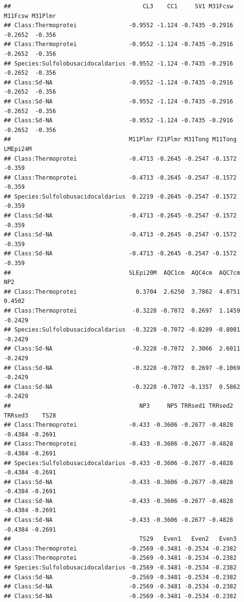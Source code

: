 \documentclass[
]{book}
\begin{document}
\begin{verbatim}
##                                      CL3    CC1     SV1 M31Fcsw M11Fcsw M31Plmr
## Class:Thermoprotei               -0.9552 -1.124 -0.7435 -0.2916 -0.2652  -0.356
## Class:Thermoprotei               -0.9552 -1.124 -0.7435 -0.2916 -0.2652  -0.356
## Species:Sulfolobusacidocaldarius -0.9552 -1.124 -0.7435 -0.2916 -0.2652  -0.356
## Class:Sd-NA                      -0.9552 -1.124 -0.7435 -0.2916 -0.2652  -0.356
## Class:Sd-NA                      -0.9552 -1.124 -0.7435 -0.2916 -0.2652  -0.356
## Class:Sd-NA                      -0.9552 -1.124 -0.7435 -0.2916 -0.2652  -0.356
##                                  M11Plmr F21Plmr M31Tong M11Tong LMEpi24M
## Class:Thermoprotei               -0.4713 -0.2645 -0.2547 -0.1572   -0.359
## Class:Thermoprotei               -0.4713 -0.2645 -0.2547 -0.1572   -0.359
## Species:Sulfolobusacidocaldarius  0.2219 -0.2645 -0.2547 -0.1572   -0.359
## Class:Sd-NA                      -0.4713 -0.2645 -0.2547 -0.1572   -0.359
## Class:Sd-NA                      -0.4713 -0.2645 -0.2547 -0.1572   -0.359
## Class:Sd-NA                      -0.4713 -0.2645 -0.2547 -0.1572   -0.359
##                                  SLEpi20M  AQC1cm  AQC4cm  AQC7cm     NP2
## Class:Thermoprotei                 0.3704  2.6250  3.7862  4.0751  0.4502
## Class:Thermoprotei                -0.3228 -0.7072  0.2697  1.1459 -0.2429
## Species:Sulfolobusacidocaldarius  -0.3228 -0.7072 -0.8289 -0.8001 -0.2429
## Class:Sd-NA                       -0.3228 -0.7072  2.3066  2.6011 -0.2429
## Class:Sd-NA                       -0.3228 -0.7072  0.2697 -0.1069 -0.2429
## Class:Sd-NA                       -0.3228 -0.7072 -0.1357  0.5862 -0.2429
##                                     NP3     NP5 TRRsed1 TRRsed2 TRRsed3    TS28
## Class:Thermoprotei               -0.433 -0.3606 -0.2677 -0.4828 -0.4384 -0.2691
## Class:Thermoprotei               -0.433 -0.3606 -0.2677 -0.4828 -0.4384 -0.2691
## Species:Sulfolobusacidocaldarius -0.433 -0.3606 -0.2677 -0.4828 -0.4384 -0.2691
## Class:Sd-NA                      -0.433 -0.3606 -0.2677 -0.4828 -0.4384 -0.2691
## Class:Sd-NA                      -0.433 -0.3606 -0.2677 -0.4828 -0.4384 -0.2691
## Class:Sd-NA                      -0.433 -0.3606 -0.2677 -0.4828 -0.4384 -0.2691
##                                     TS29   Even1   Even2   Even3
## Class:Thermoprotei               -0.2569 -0.3481 -0.2534 -0.2382
## Class:Thermoprotei               -0.2569 -0.3481 -0.2534 -0.2382
## Species:Sulfolobusacidocaldarius -0.2569 -0.3481 -0.2534 -0.2382
## Class:Sd-NA                      -0.2569 -0.3481 -0.2534 -0.2382
## Class:Sd-NA                      -0.2569 -0.3481 -0.2534 -0.2382
## Class:Sd-NA                      -0.2569 -0.3481 -0.2534 -0.2382
\end{verbatim}
\end{document}
